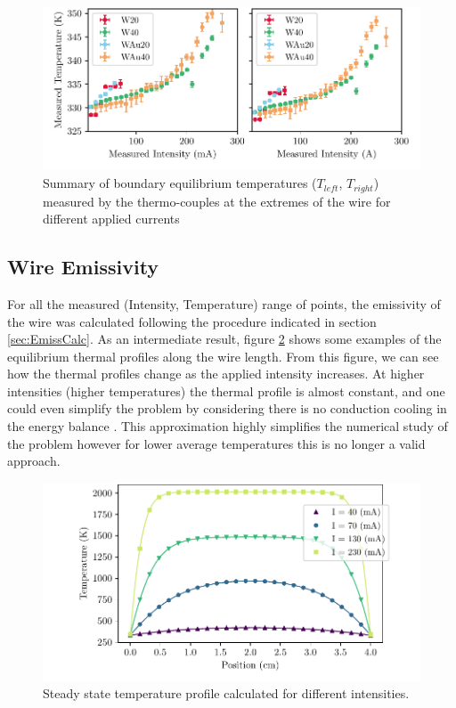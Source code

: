 \begin{figure}[h]
    \centering
    \includegraphics[width=1.0\columnwidth]{Figure_TrightTleft/TleftTright.pdf}
    \caption{Summary of boundary equilibrium temperatures ($T_{left}$, $T_{right}$) measured by the thermo-couples at the extremes of the wire for different applied currents}
    \label{fig:summaryTleftTright}
\end{figure}

\subsection{Wire Emissivity}
\label{sec:EmissRes}

For all the measured (Intensity, Temperature) range of points, the emissivity of the wire was calculated following the procedure indicated in section \ref{sec:EmissCalc}. As an intermediate result, figure \ref{fig:ThermalProfile} shows some examples of the equilibrium thermal profiles along the wire length. From this figure, we can see how the thermal profiles change as the applied intensity increases. At higher intensities (higher temperatures) the thermal profile is almost constant, and one could even simplify the problem by considering there is no conduction cooling in the energy balance \parencite[]{ref:tungstenemissi}. This approximation highly simplifies the numerical study of the problem however for lower average temperatures this is no longer a valid approach. 

\begin{figure}[h!]
    \centering
    \includegraphics[width=\columnwidth]{TempProf/TempProfPlot.pdf}
    \caption{Steady state temperature profile calculated for different intensities.}
    \label{fig:ThermalProfile}
\end{figure}

